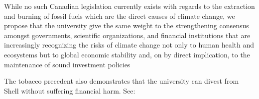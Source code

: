 While no such Canadian legislation currently exists with regards to the extraction and burning of fossil fuels which are the direct causes of climate change, we propose that the university give the same weight to the strengthening consensus amongst governments, scientific organizations, and financial institutions that are increasingly recognizing the risks of climate change not only to human health and ecosystems but to global economic stability and, on by direct implication, to the maintenance of sound investment policies



The tobacco precedent also demonstrates that the university can divest from Shell without suffering financial harm. See: 




